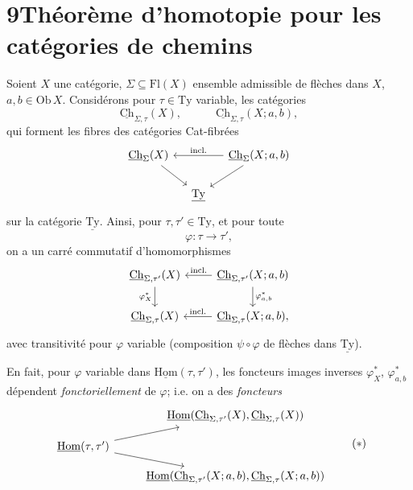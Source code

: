 \documentclass[11pt]{article}
\newcommand{\printedpage}[1]{\marginpar{\footnotesize p.~#1}}
\newcommand{\msp}[1]{\marginpar{\footnotesize [#1]}}
\newcommand{\uHom}{\underline{\mathrm{Hom}}}
\newcommand{\uCh}{\underline{\mathrm{Ch}}}
\newcommand{\uTy}{\underline{\mathrm{Ty}}}
\begin{document}
\msp{page 94}

\section*{9\quad Théorème d'homotopie pour les catégories de chemins}

Soient $X$ une catégorie, $\Sigma\subseteq\mathrm{Fl}(X)$ ensemble admissible de flèches dans $X$, $a,b\in\mathrm{Ob}\,X$. Considérons pour $\tau\in\mathrm{Ty}$ variable, les catégories
\[
\uCh_{\Sigma,\tau}(X),\qquad\quad\uCh_{\Sigma,\tau}(X;a,b),
\]
qui forment les fibres des catégories Cat-fibrées
\[
\begin{tikzcd}[column sep=small]
\uCh_\Sigma(X) \arrow[dr] & & \uCh_\Sigma(X;a,b) \arrow[ll, "\text{incl.}"'] \arrow[dl]\\
 & \uTy &
\end{tikzcd}
\]
sur la catégorie $\uTy$. Ainsi, pour $\tau,\tau'\in\mathrm{Ty}$, et pour toute
\[
\varphi:\tau\longrightarrow\tau',
\]
on a un carré commutatif d'homomorphismes
\[
\begin{tikzcd}
\uCh_{\Sigma,\tau'}(X) \arrow[d, "\varphi^*_X"'] & \uCh_{\Sigma,\tau'}(X;a,b) \arrow[l, "\text{incl.}"'] \arrow[d, "\varphi^*_{a,b}"]\\
\uCh_{\Sigma,\tau}(X) & \uCh_{\Sigma,\tau}(X;a,b), \arrow[l, "\text{incl.}"']
\end{tikzcd}
\]
avec transitivité pour $\varphi$ variable (composition $\psi\circ\varphi$ de flèches dans $\uTy$).

En fait, pour $\varphi$ variable dans $\uHom(\tau,\tau')$, les foncteurs images inverses $\varphi^*_X$, $\varphi^*_{a,b}$ dépendent \textit{fonctoriellement} de $\varphi$; i.e. on a des \textit{foncteurs}
\[
\begin{tikzcd}[row sep=small]
 & \uHom(\uCh_{\Sigma,\tau'}(X),\uCh_{\Sigma,\tau}(X))\\
\uHom(\tau,\tau') \arrow[ur] \arrow[dr] & \\
 & \uHom(\uCh_{\Sigma,\tau'}(X;a,b),\uCh_{\Sigma,\tau}(X;a,b))
\end{tikzcd}
\tag*{$(*)$}
\]

\newpage
\printedpage{61}

\msp{page 95}
\end{document}
